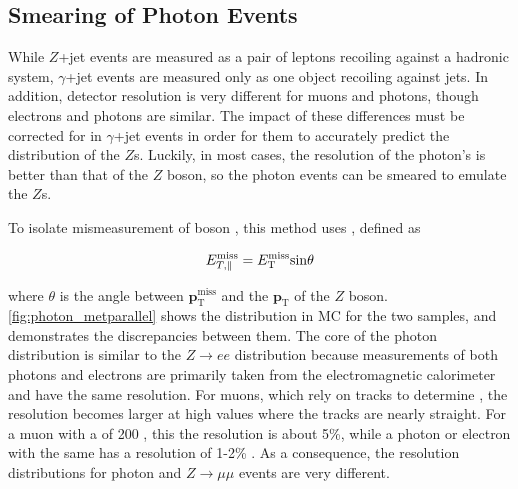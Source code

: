 \subsection{Smearing of Photon Events}
\label{sec:photon_smearing}

While $Z$+jet events are measured as a pair of leptons recoiling against a hadronic system, $\gamma$+jet events are measured only as one  object recoiling against jets. In addition, detector resolution is very different for muons and photons, though electrons and photons are similar. The impact of these differences must be corrected for in $\gamma$+jet events in order for them to accurately predict the \met distribution of the $Z$s. Luckily, in most cases, the resolution of the photon's \pt is better than that of the $Z$ boson, so the photon events can be smeared to emulate the $Z$s.  

To isolate mismeasurement of boson \pt, this method uses \metl, defined as

\begin{equation}
E_{T,\parallel}^{\mathrm{miss}} = E_{\text{T}}^{\text{miss}} \mathrm{sin} \theta
\end{equation}

where $\theta$ is the angle between ${\boldsymbol p}_{\mathrm{T}}^\mathrm{miss}$ and the ${\boldsymbol p}_{\mathrm{T}}$ of the $Z$ boson. \autoref{fig:photon_metparallel} shows the \metl distribution in \ac{MC} for the two samples, and demonstrates the discrepancies between them. The core of the photon distribution is similar to the $Z\rightarrow ee$ distribution because measurements of both photons and electrons are primarily taken from the electromagnetic calorimeter and have the same resolution. For muons, which rely on tracks to determine \pt, the resolution becomes larger at high \pt values where the tracks are nearly straight. For a muon with a \pt of 200 \gev, this the resolution is about 5\%, while a photon or electron with the same \pt has a resolution of 1-2\% \cite{Aad:2014zya, Aad:2014nim}. As a consequence, the resolution distributions for photon and $Z\rightarrow\mu\mu$ events are very different. 

